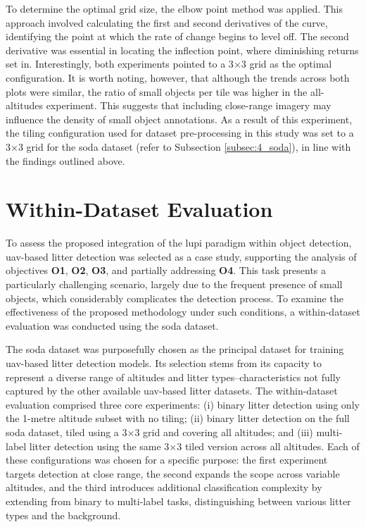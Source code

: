 To determine the optimal grid size, the elbow point \cite{elbow_point} method was applied. This approach involved calculating the first and second derivatives of the curve, identifying the point at which the rate of change begins to level off. The second derivative was essential in locating the inflection point, where diminishing returns set in.
Interestingly, both experiments pointed to a 3$\times$3 grid as the optimal configuration. It is worth noting, however, that although the trends across both plots were similar, the ratio of small objects per tile was higher in the all-altitudes experiment. This suggests that including close-range imagery may influence the density of small object annotations.
As a result of this experiment, the tiling configuration used for dataset pre-processing in this study was set to a 3$\times$3 grid for the \gls{soda} dataset (refer to Subsection \ref{subsec:4_soda}), in line with the findings outlined above.

\section{Within-Dataset Evaluation}
\label{sec:5_within_dataset_exp}


To assess the proposed integration of the \gls{lupi} paradigm within object detection, \gls{uav}-based litter detection was selected as a case study, supporting the analysis of objectives \textbf{O1}, \textbf{O2}, \textbf{O3}, and partially addressing \textbf{O4}. This task presents a particularly challenging scenario, largely due to the frequent presence of small objects, which considerably complicates the detection process. To examine the effectiveness of the proposed methodology under such conditions, a within-dataset evaluation was conducted using the \gls{soda} dataset.

The \gls{soda} dataset was purposefully chosen as the principal dataset for training \gls{uav}-based litter detection models. Its selection stems from its capacity to represent a diverse range of altitudes and litter types--characteristics not fully captured by the other available \gls{uav}-based litter datasets. The within-dataset evaluation comprised three core experiments: (i) binary litter detection using only the 1-metre altitude subset with no tiling; (ii) binary litter detection on the full \gls{soda} dataset, tiled using a 3$\times$3 grid and covering all altitudes; and (iii) multi-label litter detection using the same 3$\times$3 tiled version across all altitudes. Each of these configurations was chosen for a specific purpose: the first experiment targets detection at close range, the second expands the scope across variable altitudes, and the third introduces additional classification complexity by extending from binary to multi-label tasks, distinguishing between various litter types and the background.

